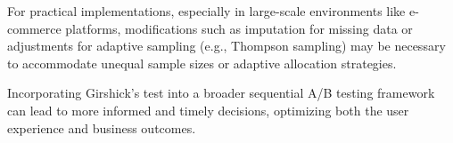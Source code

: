 \documentclass[magisterska, english]{pwr_wmat_praca_dyplomowa}
\theoremstyle{plain}
\numberwithin{theorem}{chapter}
\theoremstyle{definition}
\numberwithin{theorem}{chapter}
\begin{document}
For practical implementations, especially in large-scale environments like e-commerce platforms, modifications such as imputation for missing data or adjustments for adaptive sampling (e.g., Thompson sampling) may be necessary to accommodate unequal sample sizes or adaptive allocation strategies.

Incorporating Girshick's test into a broader sequential A/B testing framework can lead to more informed and timely decisions, optimizing both the user experience and business outcomes.

%
%
%
%
\end{document}
